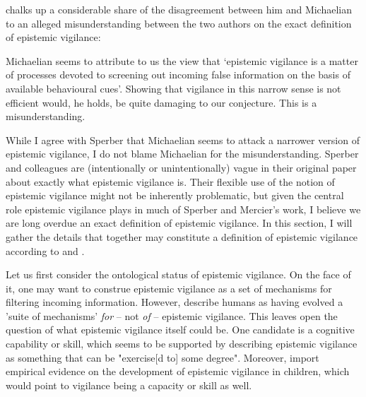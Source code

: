 \citet{Sperber13} chalks up a considerable share of the disagreement between him and Michaelian to an alleged misunderstanding between the two authors on the exact definition of epistemic vigilance:
\begin{quoting}
    Michaelian seems to attribute to us the view that ‘epistemic vigilance is a matter of processes devoted to screening out incoming false information on the basis of available behavioural cues’. Showing that vigilance in this narrow sense is not efficient would, he holds, be quite damaging to our conjecture. This is a misunderstanding.
    \hfill \citep[p.~65]{Sperber13}
\end{quoting}
While I agree with Sperber that Michaelian seems to attack a narrower version of epistemic vigilance, I do not blame Michaelian for the misunderstanding. Sperber and colleagues are (intentionally or unintentionally) vague in their original paper about exactly what epistemic vigilance is.
Their flexible use of the notion of epistemic vigilance might not be inherently problematic, but given the central role epistemic vigilance plays in much of Sperber and Mercier's work, I believe we are long overdue an exact definition of epistemic vigilance. In this section, I will gather the details that together may constitute a definition of epistemic vigilance according to \citet{Sperber10} and \citet{Sperber13}.

Let us first consider the ontological status of epistemic vigilance. On the face of it, one may want to construe epistemic vigilance as a set of mechanisms for filtering incoming information. However, \citet{Sperber10} describe humans as having evolved a 'suite of mechanisms' \emph{for} -- not \emph{of} -- epistemic vigilance. This leaves open the question of what epistemic vigilance itself could be. One candidate is a cognitive capability or skill, which seems to be supported by \citet[p.~60]{MS11} describing epistemic vigilance as something that can be "exercise[d to] some degree". Moreover, \citet[\S 5]{Sperber10} import empirical evidence on the development of epistemic vigilance in children, which would point to vigilance being a capacity or skill as well.

